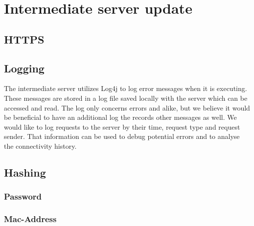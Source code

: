 \section{Intermediate server update}

\subsection*{HTTPS}

\subsection*{Logging}
The intermediate server utilizes Log4j\cite{log4j} to log error messages when it is executing. These messages are stored in a log file saved locally with the server which can be accessed and read. The log only concerns errors and alike, but we believe it would be beneficial to have an additional log the records other messages as well. We would like to log requests to the server by their time, request type and request sender. That information can be used to debug potential errors and to analyse the connectivity history. 

\subsection*{Hashing}

\subsubsection*{Password}

\subsubsection*{Mac-Address}